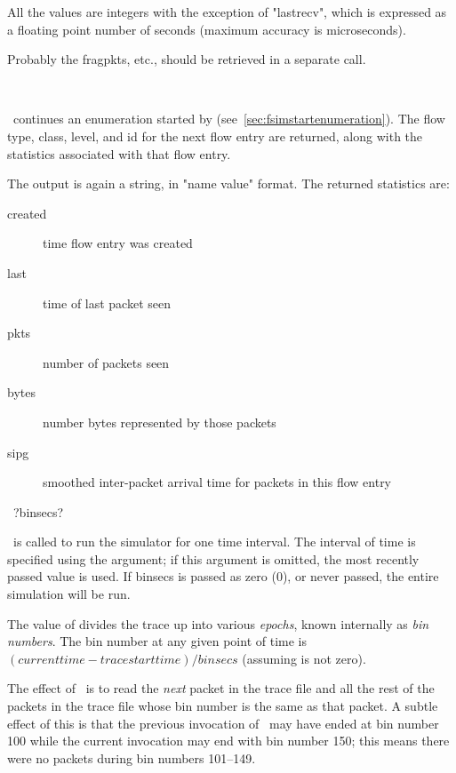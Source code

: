 \documentclass{article}
\begin{document}
All the values are integers with the exception of "lastrecv", which is
expressed as a floating point number of seconds (maximum accuracy is
microseconds).

\BUGS

Probably the fragpkts, etc., should be retrieved in a separate call.

\manend


\SYNOPSIS \cmdname\

\DESCRIPTION

\cmdname\ continues an enumeration started by
 (see~\ref{sec:fsimstartenumeration}).
The flow type, class, level, and id for the next flow entry are
returned, along with the statistics associated with that flow entry.

The output is again a string, in "name value" format.  The returned
statistics are:
\begin{description}
\item[created] time flow entry was created
\item[last] time of last packet seen
\item[pkts] number of packets seen
\item[bytes] number bytes represented by those packets
\item[sipg] smoothed inter-packet arrival time for packets in this flow
entry
\end{description}

\manend


\SYNOPSIS \cmdname\ ?binsecs?

\DESCRIPTION

\cmdname\ is called to run the simulator for one time
interval.  The interval of time is specified using the 
argument; if this argument is omitted, the most recently passed value
is used.  If binsecs is passed as zero (0), or never passed, the entire
simulation will be run.

The value of  divides the trace up into various
\emph{epochs}, known internally as \emph{bin numbers}.  The bin number
at any given point of time is $(currenttime-tracestarttime)/binsecs$
(assuming  is not zero).

The effect of \cmdname\ is to read the \emph{next}
packet in the trace file and all the rest of the packets in the trace
file whose bin number is the same as that packet.  A subtle effect of
this is that the previous invocation of \cmdname\ may
have ended at bin number 100 while the current invocation may end with
bin number 150; this means there were no packets during bin numbers
101--149.
\end{document}
